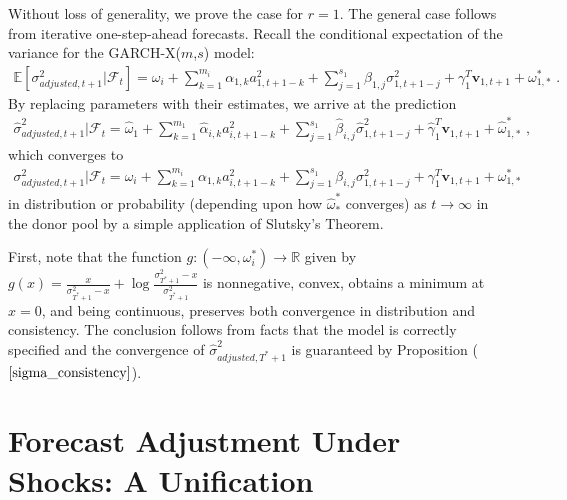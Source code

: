 \documentclass{uiucthesis2021}
\newcommand{\x}{\textbf{v}}
\def\E{\mathbb{E}} %
\theoremstyle{definition}
\newenvironment{proof-of-proposition}[1][{}]{\noindent{\bf
    Proof of Proposition {#1}}
  \hspace*{.5em}}{\qed\bigskip\\}
\begin{document}
    \begin{proof-of-proposition}[\ref{sigma_consistency}]
      Without loss of generality, we prove the case for $r = 1$.  The general case follows from iterative one-step-ahead forecasts.  Recall the conditional expectation of the variance for the GARCH-X($m$,$s$) model:
      \begin{align*}
      \E[\sigma^{2}_{adjusted,t+1}|\mathcal{F}_{t}] = \omega_{i} +  \sum^{m_{i}}_{k=1}\alpha_{1,k}a^{2}_{1,t+1-k} + \sum_{j=1}^{s_{1}}\beta_{1,j}\sigma_{1,t+1-j}^{2} + \gamma_{1}^{T} \x_{1,t+1} + \omega^{*}_{1,*} \text{ .}
      \end{align*}
      By replacing parameters with their estimates, we arrive at the prediction 
      \begin{align*}
      \hat\sigma^{2}_{adjusted,t+1}|\mathcal{F}_{t} = \hat\omega_{1} + \sum^{m_{1}}_{k=1}\hat\alpha_{i,k}a^{2}_{i,t+1-k} + \sum_{j=1}^{s_{1}}\hat\beta_{i,j}\hat\sigma_{1,t+1-j}^{2} + \hat\gamma_{1}^{T} \x_{1,t+1} + \hat\omega^{*}_{1,*}\text { ,}
      \end{align*}
      which converges to 
      \begin{align*}
        \sigma^{2}_{adjusted,t+1}|\mathcal{F}_{t} = \omega_{i} + \sum^{m_{i}}_{k=1}\alpha_{1,k}a^{2}_{i,t+1-k} + \sum_{j=1}^{s_{1}}\beta_{i,j}\sigma_{1,t+1-j}^{2} + \gamma_{1}^{T} \x_{1,t+1} + \omega^{*}_{1,*}
        \end{align*}
      in distribution or probability (depending upon how $\hat\omega^{*}_{*}$ converges) as $t\rightarrow\infty$ in the donor pool by a simple application of Slutsky's Theorem.
      \end{proof-of-proposition}

  \begin{proof-of-proposition}[\ref{asymptotic_consistency}]
    First, note that the function $g:(-\infty,\omega_{i}^{*})\rightarrow \mathbb{R}$ given by $g(x) = \frac{x}{\sigma^{2}_{T^{*}+1}-x} + \log{\frac{\sigma_{T^{*}+1}^{2}-x}{\sigma_{T^{*}+1}^{2}} }$ is nonnegative, convex, obtains a minimum at $x = 0$, and being continuous, preserves both convergence in distribution and consistency. The conclusion follows from facts that the model is correctly specified and the convergence of $\hat\sigma^{2}_{adjusted,T^{*}+1}$ is guaranteed by Proposition ($\ref{sigma_consistency}$). 
  \end{proof-of-proposition}

  \chapter{Forecast Adjustment Under Shocks: A Unification}
\end{document}
